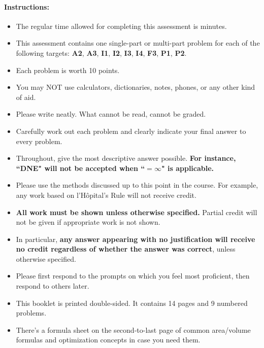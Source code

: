 \documentclass[11pt]{article}
\begin{document}
{%

\paragraph*{Instructions:}

\begin{itemize}
    
    \item The regular time allowed for completing this assessment is  minutes.
    \item This assessment contains one single-part or multi-part problem for each of the following targets:  {\bf\color{RedOrange}A2}, {\bf\color{RedOrange}A3}, {\bf\color{Fuchsia}I1}, {\bf\color{Fuchsia}I2}, {\bf\color{Fuchsia}I3}, {\bf\color{Fuchsia}I4}, {\bf\color{ProcessBlue}F3}, {\bf\color{Orange}P1}, {\bf\color{Orange}P2}.
     \item Each problem is worth 10 points.
    \item You may NOT use calculators, dictionaries, notes, phones, or any other kind of aid.
    \item Please write neatly. What cannot be read, cannot be graded.
    \item Carefully work out each problem and clearly indicate your final answer to every problem.
    \item Throughout, give the most descriptive answer possible. \textbf{For instance, ``DNE" will not be accepted when ``$=\infty$" is applicable.}
    \item Please use the methods discussed up to this point in the course. For example, any work based on l'H\^opital's Rule will not receive credit.
    \item \textbf{All work must be shown unless otherwise specified.} Partial credit will not be given if appropriate work is not shown.
    \item In particular, {\bf any answer appearing with no justification will receive no credit regardless of whether the answer was correct}, unless otherwise specified.
    \item Please first respond to the prompts on which you feel most proficient, then respond to others later.
    \item This booklet is printed double-sided. It contains 14 pages and 9 numbered problems.
    \item There's a formula sheet on the second-to-last page of common area/volume formulas and optimization concepts in case you need them.
    \end{itemize}
    
    }
\end{document}
